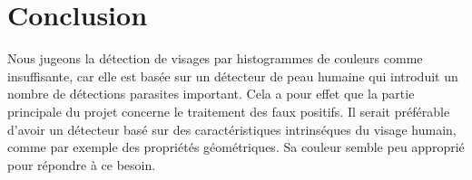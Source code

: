 \documentclass[a4paper,11pt]{article}
\begin{document}
\section{Conclusion}
Nous jugeons la détection de visages par histogrammes de couleurs comme insuffisante, car elle est basée sur un détecteur de peau humaine qui introduit un nombre de détections parasites important.
Cela a pour effet que la partie principale du projet concerne le traitement des faux positifs.
Il serait préférable d'avoir un détecteur basé sur des caractéristiques intrinséques du visage humain, comme par exemple des propriétés géométriques.
Sa couleur semble peu approprié pour répondre à ce besoin.
\end{document}
